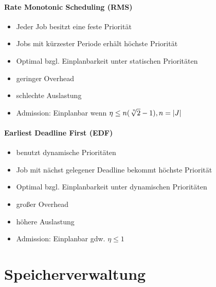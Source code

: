 \documentclass[12pt,a4paper]{article}
\begin{document}
\paragraph{Rate Monotonic Scheduling (RMS)}
\flushleft
\begin{itemize}
\item Jeder Job besitzt eine feste Priorität
\item Jobs mit kürzester Periode erhält höchste Priorität
\item Optimal bzgl. Einplanbarkeit unter statischen Prioritäten
\item geringer Overhead
\item schlechte Auslastung
\item Admission: Einplanbar wenn $\eta \leq n(\sqrt[\leftroot{-2}\uproot{2} n]{2} -1), n=|J|$
\end{itemize}

\paragraph{Earliest Deadline First (EDF)}
\flushleft
\begin{itemize}
\item benutzt dynamische Prioritäten
\item Job mit nächst gelegener Deadline bekommt höchste Priorität
\item Optimal bzgl. Einplanbarkeit unter dynamischen Prioritäten
\item großer Overhead
\item höhere Auslastung
\item Admission: Einplanbar gdw. $\eta \leq 1$
\end{itemize}

\section{Speicherverwaltung}
\end{document}
